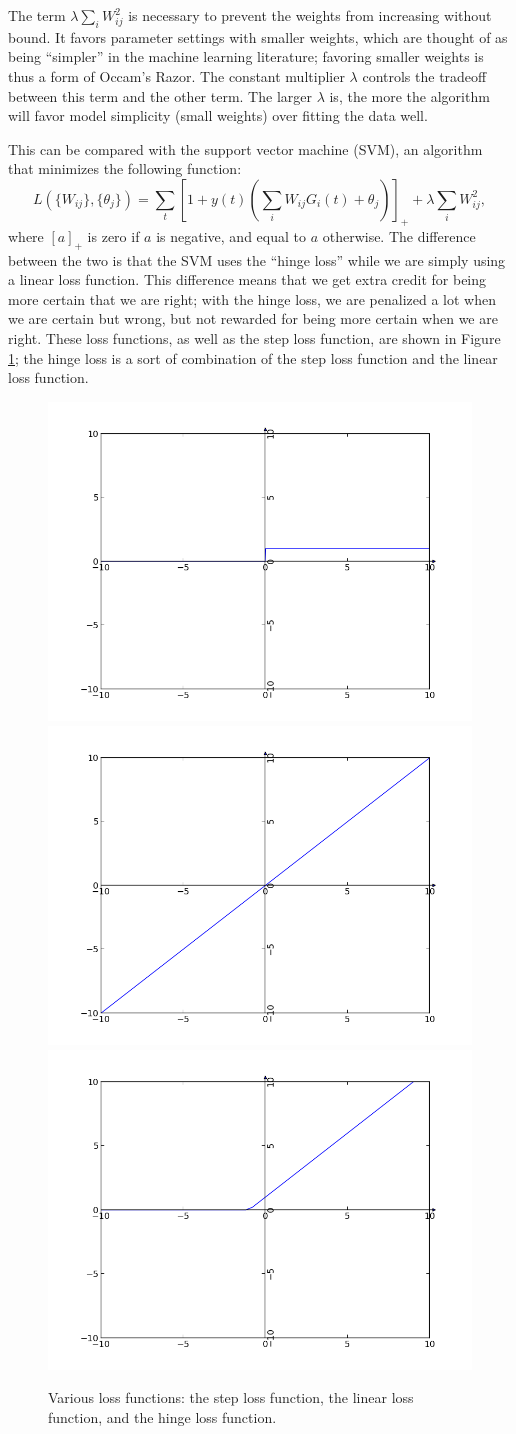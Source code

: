 \documentclass{article}
\theoremstyle{definition}
\begin{document}
The term $\lambda \sum_i W_{ij}^2$ is necessary to prevent the weights
from increasing without bound. It favors parameter settings with
smaller weights, which are thought of as being ``simpler'' in the
machine learning literature; favoring smaller weights is thus a form
of Occam's Razor. The constant multiplier $\lambda$ controls the
tradeoff between this term and the other term. The larger $\lambda$
is, the more the algorithm will favor model simplicity (small weights)
over fitting the data well.

This can be compared with the support vector machine (SVM), an
algorithm that minimizes the following function:
$$L(\{W_{ij}\}, \{\theta_j\}) = \sum_t \left[ 1+y(t)\left(\sum_i
  W_{ij} G_i(t) + \theta_j\right)\right]_+ + \lambda \sum_i
W_{ij}^2,$$ where $[a]_+$ is zero if $a$ is negative, and
equal to $a$ otherwise. The difference between the two is that
the SVM uses the ``hinge loss'' while we are simply using a linear
loss function. This difference means that we get extra credit for
being more certain that we are right; with the hinge loss, we are
penalized a lot when we are certain but wrong, but not rewarded for
being more certain when we are right. These loss functions, as well as
the step loss function, are shown in Figure \ref{fig-hinge}; the hinge
loss is a sort of combination of the step loss function and the linear
loss function.

\begin{figure}
\includegraphics[width=0.3\linewidth]{step_loss.png}
\includegraphics[width=0.3\linewidth]{linear_loss.png}
\includegraphics[width=0.3\linewidth]{hinge_loss.png}
\caption{Various loss functions: the step loss function, the linear loss function, and the hinge loss function.}
\label{fig-hinge}
\end{figure}
\end{document}
